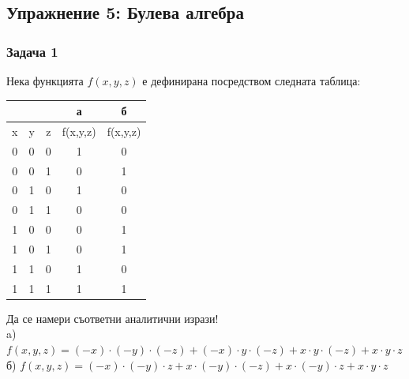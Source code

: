 \documentclass[fleqn, 12pt]{article}
\theoremstyle{definition}
\begin{document}
\newpage
\subsection{Упражнение 5: Булева алгебра}

\subsubsection*{Задача 1}
Нека функцията $f(x,y,z)$ е дефинирана посредством следната таблица:
\begin{table}[htp]
\begin{center}
\begin{tabular}{|c|c|c|c|c|} 
\hline
  &  &   & а  & б \\
\hline
x & y & z & f(x,y,z) & f(x,y,z) \\
\hline
0 & 0 & 0 & 1 & 0 \\
\hline
0 & 0 & 1 & 0 & 1 \\
\hline
0 & 1 & 0 & 1 & 0 \\
\hline
0 & 1 & 1 & 0 & 0 \\
\hline
1 & 0 & 0 & 0 & 1 \\
\hline
1 & 0 & 1 & 0 & 1 \\
\hline
1 & 1 & 0 & 1 & 0 \\
\hline
1 & 1 & 1 & 1 & 1 \\
\hline
\end{tabular}
\end{center}
\end{table}
Да се намери съответни аналитични изрази!  \\
a) $f(x,y,z) = (-x) \cdot (-y) \cdot (-z) +(-x) \cdot y \cdot (-z) + x \cdot y \cdot (-z) + x \cdot y \cdot z$  \\
б) $f(x,y,z) = (-x) \cdot (-y) \cdot z + x \cdot (-y) \cdot(-z) + x \cdot (-y) \cdot z + x \cdot y \cdot z$
\end{document}
